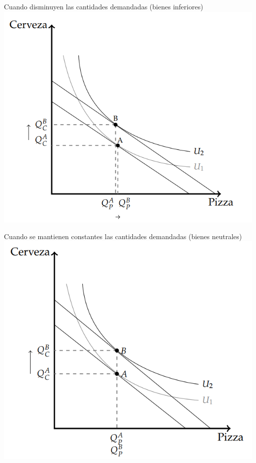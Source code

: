 \documentclass{beamer}
\begin{document}
\begin{frame}{Cuando disminuyen las cantidades demandadas (bienes inferiores)}
    \centering
    \includegraphics[scale=0.5]{../Figures/C.8.5.png}
\end{frame}

\begin{frame}{Cuando se mantienen constantes las cantidades demandadas (bienes neutrales)}
    \centering
    \includegraphics[scale=0.5]{../Figures/C.8.6.png}
\end{frame}
\end{document}
